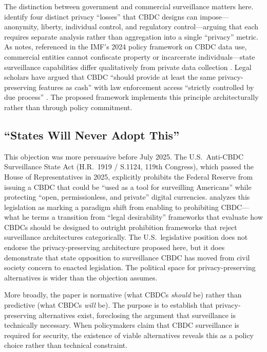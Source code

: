 \documentclass[11pt]{article}
\begin{document}
The distinction between government and commercial surveillance matters here. \citet{Rennie2021} identify four distinct privacy ``losses'' that CBDC designs can impose---anonymity, liberty, individual control, and regulatory control---arguing that each requires separate analysis rather than aggregation into a single ``privacy'' metric. As \citet{Tucker2023} notes, referenced in the IMF's 2024 policy framework on CBDC data use, commercial entities cannot confiscate property or incarcerate individuals---state surveillance capabilities differ qualitatively from private data collection \citep{IMF2024CBDC}. Legal scholars have argued that CBDC ``should provide at least the same privacy-preserving features as cash'' with law enforcement access ``strictly controlled by due process'' \citep{UFLaw2024}. The proposed framework implements this principle architecturally rather than through policy commitment.

\subsection{``States Will Never Adopt This''}

This objection was more persuasive before July 2025. The U.S.\ Anti-CBDC Surveillance State Act (H.R.~1919 / S.1124, 119th Congress), which passed the House of Representatives in 2025, explicitly prohibits the Federal Reserve from issuing a CBDC that could be ``used as a tool for surveilling Americans'' while protecting ``open, permissionless, and private'' digital currencies. \citet{Zatti2025} analyzes this legislation as marking a paradigm shift from enabling to prohibiting CBDC---what he terms a transition from ``legal desirability'' frameworks that evaluate how CBDCs should be designed to outright prohibition frameworks that reject surveillance architectures categorically. The U.S.\ legislative position does not endorse the privacy-preserving architecture proposed here, but it does demonstrate that state opposition to surveillance CBDC has moved from civil society concern to enacted legislation. The political space for privacy-preserving alternatives is wider than the objection assumes.

More broadly, the paper is normative (what CBDCs \textit{should} be) rather than predictive (what CBDCs \textit{will} be). The purpose is to establish that privacy-preserving alternatives exist, foreclosing the argument that surveillance is technically necessary. When policymakers claim that CBDC surveillance is required for security, the existence of viable alternatives reveals this as a policy choice rather than technical constraint.
\end{document}
